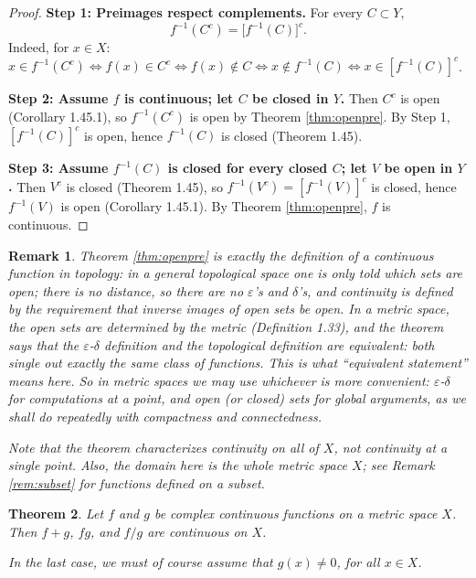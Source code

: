 \documentclass{article}
\theoremstyle{mythm}
\newtheorem{theorem}{Theorem}[section]
\newtheorem{remark}[theorem]{Remark}
\begin{document}
\begin{proof}
\textbf{Step 1: Preimages respect complements.} For every $C \subset Y$,
\[
f^{-1}(C^c) = \big[f^{-1}(C)\big]^c.
\]
Indeed, for $x \in X$: $x \in f^{-1}(C^c) \iff f(x) \in C^c \iff f(x) \notin C \iff x \notin f^{-1}(C) \iff x \in [f^{-1}(C)]^c$.

\textbf{Step 2: Assume $f$ is continuous; let $C$ be closed in $Y$.} Then $C^c$ is open (Corollary 1.45.1), so $f^{-1}(C^c)$ is open by Theorem \ref{thm:openpre}. By Step 1, $[f^{-1}(C)]^c$ is open, hence $f^{-1}(C)$ is closed (Theorem 1.45).

\textbf{Step 3: Assume $f^{-1}(C)$ is closed for every closed $C$; let $V$ be open in $Y$.} Then $V^c$ is closed (Theorem 1.45), so $f^{-1}(V^c) = [f^{-1}(V)]^c$ is closed, hence $f^{-1}(V)$ is open (Corollary 1.45.1). By Theorem \ref{thm:openpre}, $f$ is continuous.
\end{proof}

\begin{remark}\label{rem:topology}
Theorem \ref{thm:openpre} is exactly the definition of a continuous function in \textit{topology}: in a general topological space one is only told which sets are open; there is no distance, so there are no $\varepsilon$'s and $\delta$'s, and continuity is \textit{defined} by the requirement that inverse images of open sets be open. In a metric space, the open sets are determined by the metric (Definition 1.33), and the theorem says that the $\varepsilon$-$\delta$ definition and the topological definition are \textit{equivalent}: both single out exactly the same class of functions. This is what ``equivalent statement'' means here. So in metric spaces we may use whichever is more convenient: $\varepsilon$-$\delta$ for computations at a point, and open (or closed) sets for global arguments, as we shall do repeatedly with compactness and connectedness.

Note that the theorem characterizes continuity \textit{on all of $X$}, not continuity at a single point. Also, the domain here is the whole metric space $X$; see Remark \ref{rem:subset} for functions defined on a subset.
\end{remark}

\begin{theorem}\label{thm:contalgebra}
Let $f$ and $g$ be complex continuous functions on a metric space $X$. Then $f + g$, $fg$, and $f/g$ are continuous on $X$.

In the last case, we must of course assume that $g(x) \neq 0$, for all $x \in X$.
\end{theorem}
\end{document}
